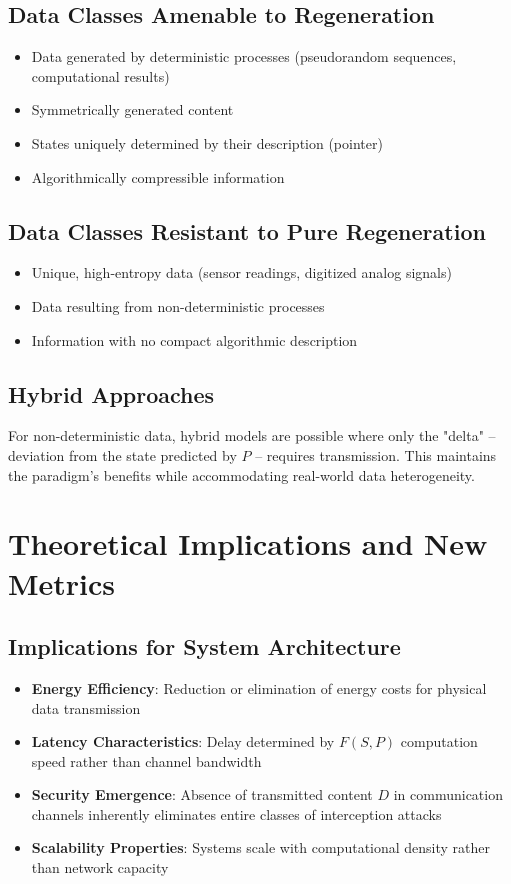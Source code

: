 \documentclass[11pt,a4paper]{article}
\begin{document}
\subsection{Data Classes Amenable to Regeneration}

\begin{itemize}
    \item Data generated by deterministic processes (pseudorandom sequences, computational results)
    \item Symmetrically generated content
    \item States uniquely determined by their description (pointer)
    \item Algorithmically compressible information
\end{itemize}

\subsection{Data Classes Resistant to Pure Regeneration}

\begin{itemize}
    \item Unique, high-entropy data (sensor readings, digitized analog signals)
    \item Data resulting from non-deterministic processes
    \item Information with no compact algorithmic description
\end{itemize}

\subsection{Hybrid Approaches}

For non-deterministic data, hybrid models are possible where only the "delta" – deviation from the state predicted by $P$ – requires transmission. This maintains the paradigm's benefits while accommodating real-world data heterogeneity.

\section{Theoretical Implications and New Metrics}

\subsection{Implications for System Architecture}

\begin{itemize}
    \item \textbf{Energy Efficiency}: Reduction or elimination of energy costs for physical data transmission
    \item \textbf{Latency Characteristics}: Delay determined by $F(S, P)$ computation speed rather than channel bandwidth
    \item \textbf{Security Emergence}: Absence of transmitted content $D$ in communication channels inherently eliminates entire classes of interception attacks
    \item \textbf{Scalability Properties}: Systems scale with computational density rather than network capacity
\end{itemize}
\end{document}
